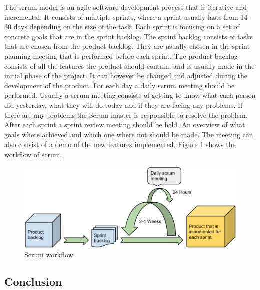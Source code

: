 The scrum model is an agile software development process that is iterative and incremental.
It consists of multiple sprints, where a sprint usually lasts from 14-30 days depending on the size of the task.
Each sprint is focusing on a set of concrete goals that are in the sprint backlog.
The sprint backlog consists of tasks that are chosen from the product backlog. 
They are usually chosen in the sprint planning meeting that is performed before each sprint.
The product backlog consists of all the features the product should contain, and is usually made in the initial phase of the project.
It can however be changed and adjusted during the development of the product.
For each day a daily scrum meeting should be performed. 
Usually a scrum meeting consists of getting to know what each person did yesterday, what they will do today and if they are facing any problems.
If there are any problems the Scrum master is responsible to resolve the problem.
After each sprint a sprint review meeting should be held.
An overview of what goals where achieved and which one where not should be made.
The meeting can also consist of a demo of the new features implemented. 
Figure \ref{figure:scrum-workflow} shows the workflow of scrum.

\begin{figure}
\begin{center}
\includegraphics[scale=0.5]{../Figures/Scrum-workflow.pdf}
\end{center}
\caption{Scrum workflow}
\label{figure:scrum-workflow}
\end{figure}

\subsection{Conclusion}

